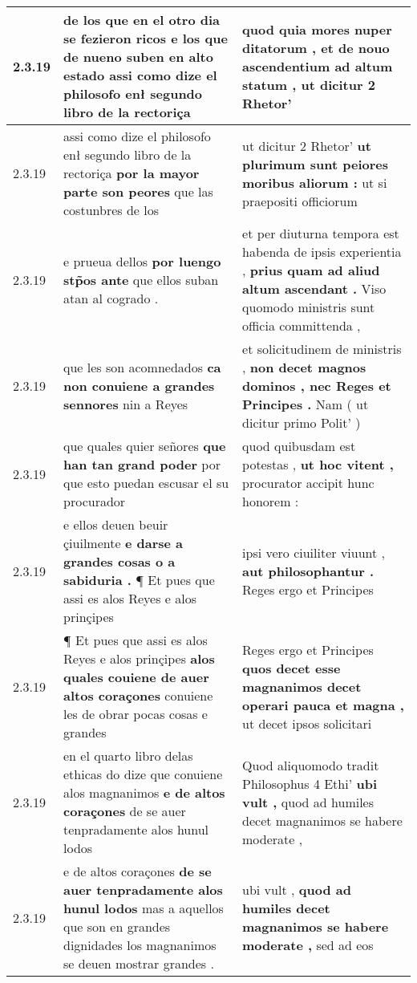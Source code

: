 \begin{tabular}{|p{1cm}|p{6.5cm}|p{6.5cm}|}
2.3.19 & de los que en el otro dia se fezieron ricos \textbf{ e los que de nueno suben en alto estado } assi como dize el philosofo enł segundo libro de la rectoriça & quod quia mores nuper ditatorum , \textbf{ et de nouo ascendentium ad altum statum , } ut dicitur 2 Rhetor’ \\\hline
2.3.19 & assi como dize el philosofo enł segundo libro de la rectoriça \textbf{ por la mayor parte son peores } que las costunbres de los & ut dicitur 2 Rhetor’ \textbf{ ut plurimum sunt peiores moribus aliorum : } ut si praepositi officiorum \\\hline
2.3.19 & e prueua dellos \textbf{ por luengo stp̃os ante } que ellos suban atan al cogrado . & et per diuturna tempora est habenda de ipsis experientia , \textbf{ prius quam ad aliud altum ascendant . } Viso quomodo ministris sunt officia committenda , \\\hline
2.3.19 & que les son acomnedados \textbf{ ca non conuiene a grandes sennores } nin a Reyes & et solicitudinem de ministris , \textbf{ non decet magnos dominos , nec Reges et Principes . } Nam ( ut dicitur primo Polit’ ) \\\hline
2.3.19 & que quales quier señores \textbf{ que han tan grand poder } por que esto puedan escusar el su procurador & quod quibusdam est potestas , \textbf{ ut hoc vitent , } procurator accipit hunc honorem : \\\hline
2.3.19 & e ellos deuen beuir çiuilmente \textbf{ e darse a grandes cosas o a sabiduria . } ¶ Et pues que assi es alos Reyes e alos prinçipes & ipsi vero ciuiliter viuunt , \textbf{ aut philosophantur . } Reges ergo et Principes \\\hline
2.3.19 & ¶ Et pues que assi es alos Reyes e alos prinçipes \textbf{ alos quales couiene de auer altos coraçones } conuiene les de obrar pocas cosas e grandes & Reges ergo et Principes \textbf{ quos decet esse magnanimos decet operari pauca et magna , } ut decet ipsos solicitari \\\hline
2.3.19 & en el quarto libro delas ethicas do dize que conuiene alos magnanimos \textbf{ e de altos coraçones } de se auer tenpradamente alos hunul lodos & Quod aliquomodo tradit Philosophus 4 Ethi’ \textbf{ ubi vult , } quod ad humiles decet magnanimos se habere moderate , \\\hline
2.3.19 & e de altos coraçones \textbf{ de se auer tenpradamente alos hunul lodos } mas a aquellos que son en grandes dignidades los magnanimos se deuen mostrar grandes . & ubi vult , \textbf{ quod ad humiles decet magnanimos se habere moderate , } sed ad eos \\\hline

\end{tabular}
